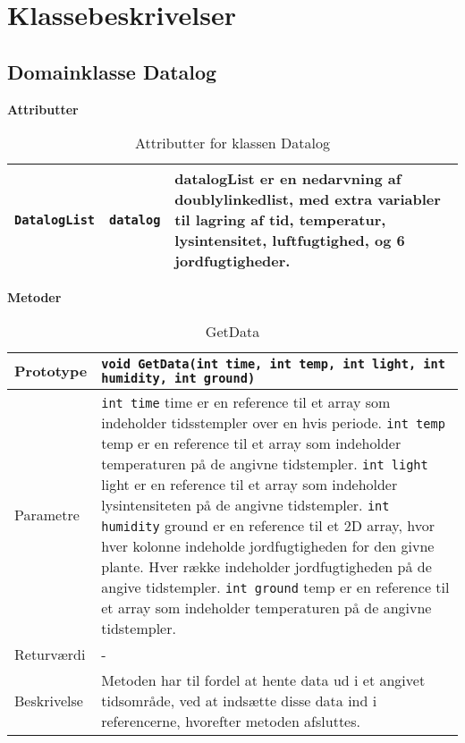 \section{Klassebeskrivelser}

\subsection{Domainklasse Datalog}

\textbf{Attributter}

\begin{table}[h]
\begin{tabularx}{\textwidth}{| >{\raggedright\arraybackslash}X | >{\raggedright\arraybackslash}X | >{\raggedright\arraybackslash}p{10 cm} |} \hline
\texttt{DatalogList} & \texttt{datalog} & datalogList er en nedarvning af doublylinkedlist, med extra variabler til lagring af tid, temperatur, lysintensitet, luftfugtighed, og 6 jordfugtigheder. \\\hline
\end{tabularx}
\caption{Attributter for klassen Datalog}
\label{table:Datalog_attributter}
\end{table}

\textbf{Metoder}

\begin{table}[h]
\begin{tabularx}{\textwidth}{| >{\raggedright\arraybackslash}p{2.5 cm} | >{\raggedright\arraybackslash}X |} \hline
Prototype & \texttt{void GetData(int time, int temp, int light, int humidity, int ground)} \\\hline
Parametre & \texttt{int time} \newline 
time er en reference til et array som indeholder tidsstempler over en hvis periode. \newline
\texttt{int temp} \newline
temp er en reference til et array som indeholder temperaturen på de angivne tidstempler. \newline
\texttt{int light} \newline
light er en reference til et array som indeholder lysintensiteten på de angivne tidstempler. \newline
\texttt{int humidity} \newline
ground er en reference til et 2D array, hvor hver kolonne indeholde jordfugtigheden for den givne plante. Hver række indeholder jordfugtigheden på de angive tidstempler. \newline
\texttt{int ground} \newline
temp er en reference til et array som indeholder temperaturen på de angivne tidstempler. \\\hline
Returværdi & - \\\hline
Beskrivelse & Metoden har til fordel at hente data ud i et angivet tidsområde, ved at indsætte disse data ind i referencerne, hvorefter metoden afsluttes. \\\hline
\end{tabularx}
\caption{GetData}
\label{table:GetData}
\end{table}

